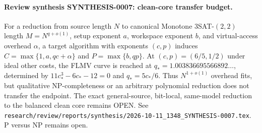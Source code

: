 \paragraph{Review synthesis SYNTHESIS-0007: clean-core transfer budget.}
For a reduction from source length $N$ to canonical Monotone
$3$SAT-$(2,2)$ length $M=N^{q+o(1)}$, setup exponent $a$, workspace
exponent $b$, and virtual-access overhead $\alpha$, a target algorithm with
exponents $(c,p)$ induces
$C=\max\{1,a,qc+\alpha\}$ and $P=\max\{b,qp\}$.
At $(c,p)=(6/5,1/2)$ under ideal other costs, the FLMV curve is reached at
$q_*=1.003836695566892\ldots$, determined by
$11c_*^3-6c_*-12=0$ and $q_*=5c_*/6$.
Thus $N^{1+o(1)}$ overhead fits, but qualitative NP-completeness or an
arbitrary polynomial reduction does not transfer the endpoint.
The exact general-source, bit-local, same-model reduction to the balanced
clean core remains OPEN.  See
\texttt{research/review/reports/synthesis/2026-10-11\_1348\_SYNTHESIS-0007.tex}.
P versus NP remains open.
